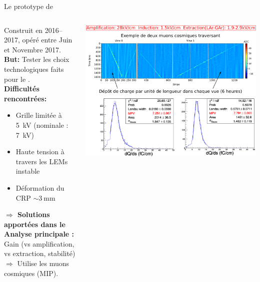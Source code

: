     \begin{frame}{Le prototype de \TOO{}}
    	\begin{scriptsize}
    		\vfill
    		\begin{columns}
    			\begin{column}{0.35\textwidth}
    				Construit en 2016--2017, opéré entre Juin et Novembre 2017.\\
    				\vspace{0.3cm}
    				\textbf{But:} Tester les choix technologiques faits pour le \SSS{}.\\
    				\vspace{0.3cm}
    				\textbf{Difficultés rencontrées:} 
    				\begin{itemize}
    					\item Grille limitée à \SI{5}{\kilo\volt} (nominale : \SI{7}{\kilo\volt})
    					\item Haute tension à travers les LEMs instable
    					\item Déformation du CRP $\sim\SI{3}{\milli\meter}$
    				\end{itemize}
    				\textbf{$\Rightarrow$ Solutions apportées dans le \SSS{}} \\
    				\vspace{0.3cm}
    				\textbf{Analyse principale :} Gain (vs amplification, vs extraction, stabilité)\\
    				$\Rightarrow$ Utilise les muons cosmiques (MIP).
    			\end{column}\hfill
    			\begin{column}{0.65\textwidth}
    				\includegraphics[width=\textwidth]{./pictures/run840.png}\\
    			\end{column}
    		\end{columns}
	    \end{scriptsize}
    \end{frame}
    
